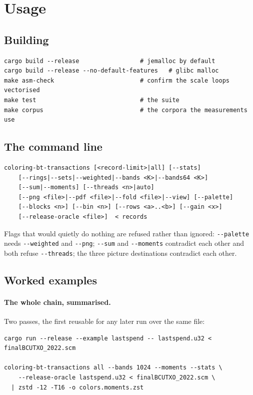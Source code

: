 \documentclass[11pt,a4paper]{article}
\newcommand{\flag}[1]{\texttt{-{}-#1}}
\begin{document}
\section{Usage}

\subsection{Building}

\begin{lstlisting}
cargo build --release                 # jemalloc by default
cargo build --release --no-default-features   # glibc malloc
make asm-check                        # confirm the scale loops vectorised
make test                             # the suite
make corpus                           # the corpora the measurements use
\end{lstlisting}

\subsection{The command line}

\begin{lstlisting}
coloring-bt-transactions [<record-limit>|all] [--stats]
    [--rings|--sets|--weighted|--bands <K>|--bands64 <K>]
    [--sum|--moments] [--threads <n>|auto]
    [--png <file>|--pdf <file>|--fold <file>|--view] [--palette]
    [--blocks <n>] [--bin <n>] [--rows <a>..<b>] [--gain <x>]
    [--release-oracle <file>]  < records
\end{lstlisting}

Flags that would quietly do nothing are refused rather than ignored:
\flag{palette} needs \flag{weighted} and \flag{png}; \flag{sum} and
\flag{moments} contradict each other and both refuse \flag{threads}; the three
picture destinations contradict each other.

\subsection{Worked examples}

\paragraph{The whole chain, summarised.} Two passes, the first reusable for any
later run over the same file:

\begin{lstlisting}
cargo run --release --example lastspend -- lastspend.u32 < finalBCUTXO_2022.scm

coloring-bt-transactions all --bands 1024 --moments --stats \
    --release-oracle lastspend.u32 < finalBCUTXO_2022.scm \
  | zstd -12 -T16 -o colors.moments.zst
\end{lstlisting}
\end{document}
